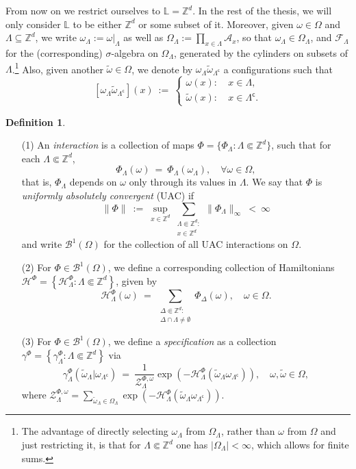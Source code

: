 \documentclass[12pt]{article}
\newcommand{\A}{\mathcal{A}}
\newcommand{\BB}{\mathscr{B}}
\newcommand{\F}{\mathcal{F}}
\renewcommand{\H}{\mathcal{H}}
\renewcommand{\L}{\mathbb{L}}
\newcommand{\Z}{\mathbb{Z}}
\newcommand{\ZZ}{\mathcal{Z}}
\newcommand{\set}[1]{\left\{#1\right\}}
\newcommand{\1}{\mathbbm{1}}
\renewcommand{\c}{\mathsf{c}}
\newcommand{\5}{\vspace{0.5cm}}
\renewcommand{\tilde}{\widetilde}
\theoremstyle{definition}
\newtheorem{df}[thm]{Definition}
\begin{document}
From now on we restrict ourselves to $\L=\Z^d$. In the rest of the thesis, we will only consider $\L$ to be either $\Z^d$ or some subset of it. Moreover, given $\omega\in\Omega$ and $\Lambda\subseteq\Z^d$, we write $\omega_\Lambda:=\omega|_\Lambda$ as well as $\Omega_\Lambda:=\prod_{x\in\Lambda}\A_x$, so that $\omega_\Lambda\in\Omega_\Lambda$, and $\F_\Lambda$ for the (corresponding) $\sigma$-algebra on $\Omega_\Lambda$, generated by the cylinders on subsets of $\Lambda$.\footnote{The advantage of directly selecting $\omega_\Lambda$ from $\Omega_\Lambda$, rather than $\omega$ from $\Omega$ and just restricting it, is that for $\Lambda\Subset\Z^d$ one has $|\Omega_\Lambda|<\infty$, which allows for finite sums.} Also, given another $\tilde{\omega}\in\Omega$, we denote by $\omega_\Lambda\tilde{\omega}_{\Lambda^\c}$ a configurations such that
$$[\omega_\Lambda\tilde{\omega}_{\Lambda^\c}](x) ~:=~ \begin{cases}
\omega(x): ~&x\in\Lambda,\\
\tilde{\omega}(x): ~&x\in\Lambda^\c.
\end{cases}$$

\begin{df}~
\begin{itemize}
	\item[(1)] An \textit{interaction} is a collection of maps $\Phi=\{\Phi_\Lambda:\Lambda\Subset\Z^d\}$, such that for each $\Lambda\Subset\Z^d$,
$$\Phi_\Lambda(\omega) ~=~ \Phi_\Lambda(\omega_\Lambda), \quad \forall\omega\in\Omega,$$
that is, $\Phi_\Lambda$ depends on $\omega$ only through its values in $\Lambda$. We say that $\Phi$ is \textit{uniformly absolutely convergent} (UAC) if 
$$\|\Phi\| ~:=~ \sup_{x\in\Z^d}\sum_{\substack{\Lambda\Subset\Z^d:\\x\in\Z^d}}\|\Phi_\Lambda\|_\infty ~<~ \infty$$
and write $\BB^1(\Omega)$ for the collection of all UAC interactions on $\Omega$.
	\item[(2)] For $\Phi\in\BB^1(\Omega)$, we define a corresponding collection of Hamiltonians $\H^\Phi=\set{\H_\Lambda^\Phi:\Lambda\Subset\Z^d}$, given by
	$$\H_\Lambda^\Phi(\omega) ~=~ \sum_{\substack{\Delta\Subset\Z^d:\\\Delta\cap\Lambda\neq\emptyset}}\Phi_\Delta(\omega), \quad \omega\in\Omega.$$
	\item[(3)] For $\Phi\in\BB^1(\Omega)$, we define a \textit{specification} as a collection $\gamma^\Phi=\set{\gamma_\Lambda^\Phi:\Lambda\Subset\Z^d}$ via
	$$\gamma_\Lambda^\Phi(\tilde{\omega}_\Lambda|\omega_{\Lambda^\c}) ~=~ \frac{1}{\ZZ_\Lambda^{\Phi,\omega}}\exp(-\H_\Lambda^\Phi(\tilde{\omega}_\Lambda\omega_{\Lambda^\c})), \quad \omega,\tilde{\omega}\in\Omega,$$
	where $\ZZ_\Lambda^{\Phi,\omega}=\sum_{\tilde{\omega}_\Lambda\in\Omega_\Lambda}\exp(-\H_\Lambda^\Phi(\tilde{\omega}_\Lambda\omega_{\Lambda^\c}))$.
\end{itemize}
\end{df}
\end{document}
